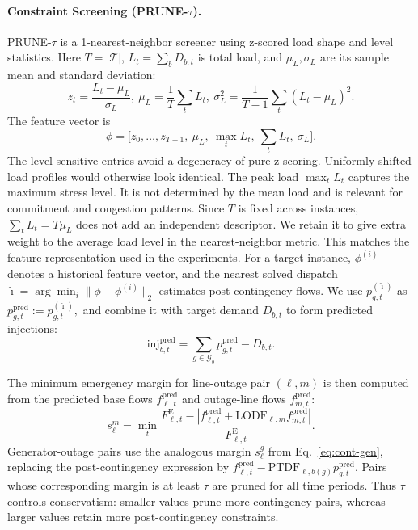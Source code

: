 \documentclass[runningheads]{llncs}
\begin{document}
\paragraph{Constraint Screening (PRUNE-$\tau$).}
PRUNE-$\tau$ is a 1-nearest-neighbor screener using z-scored load shape and level statistics. Here $T=|\mathcal{T}|$, $L_t=\sum_b D_{b,t}$ is total load, and $\mu_L,\sigma_L$ are its sample mean and standard deviation:
\begin{equation}
z_t=\frac{L_t-\mu_L}{\sigma_L}, \ \mu_L=\frac{1}{T}\sum_t L_t, \ \sigma_L^2=\frac{1}{T-1}\sum_t(L_t-\mu_L)^2.
\end{equation}
The feature vector is
\begin{equation}
\phi=\big[z_0,\dots,z_{T-1},\ \mu_L,\ \max_t L_t,\ \sum_t L_t,\ \sigma_L\big].
\end{equation}
The level-sensitive entries avoid a degeneracy of pure z-scoring. Uniformly shifted load profiles would otherwise look identical. The peak load $\max_t L_t$ captures the maximum stress level. It is not determined by the mean load and is relevant for commitment and congestion patterns. Since $T$ is fixed across instances, $\sum_t L_t=T\mu_L$ does not add an independent descriptor. We retain it to give extra weight to the average load level in the nearest-neighbor metric. This matches the feature representation used in the experiments. For a target instance, $\phi^{(i)}$ denotes a historical feature vector, and the nearest solved dispatch $\hat{\imath}=\arg\min_i \|\phi-\phi^{(i)}\|_2$ estimates post-contingency flows. We use
$p^{(\hat{\imath})}_{g,t}$ as
$
p^{\mathrm{pred}}_{g,t} := p^{(\hat{\imath})}_{g,t},
$ and combine it with target demand $D_{b,t}$ to form predicted injections:
\begin{equation}
\mathrm{inj}^{\mathrm{pred}}_{b,t}=\sum_{g\in\mathcal{G}_b} p^{\mathrm{pred}}_{g,t} - D_{b,t}.
\end{equation}

The minimum emergency margin for line-outage pair $(\ell,m)$ is then computed from the predicted base flows $f^{\mathrm{pred}}_{\ell,t}$ and outage-line flows $f^{\mathrm{pred}}_{m,t}$:
\begin{equation}
s^{m}_{\ell}=\min_t \frac{F^{\mathrm{E}}_{\ell,t}-|f^{\mathrm{pred}}_{\ell,t}+\mathrm{LODF}_{\ell,m}f^{\mathrm{pred}}_{m,t}|}{F^{\mathrm{E}}_{\ell,t}}.
\end{equation}
Generator-outage pairs use the analogous margin $s^g_\ell$ from Eq.~\eqref{eq:cont-gen}, replacing the post-contingency expression by $f^{\mathrm{pred}}_{\ell,t}-\mathrm{PTDF}_{\ell,b(g)}p^{\mathrm{pred}}_{g,t}$. Pairs whose corresponding margin is at least $\tau$ are pruned for all time periods. Thus $\tau$ controls conservatism: smaller values prune more contingency pairs, whereas larger values retain more post-contingency constraints.
\end{document}
